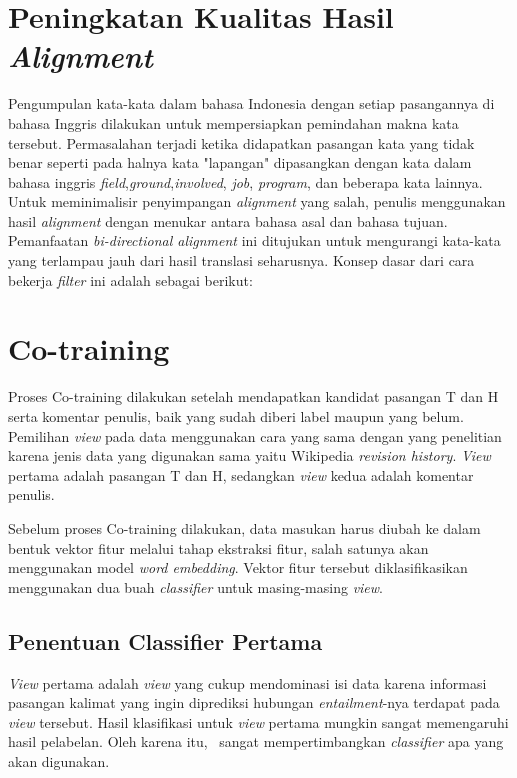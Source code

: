 \section{Peningkatan Kualitas Hasil \textit{Alignment}}
Pengumpulan kata-kata dalam bahasa Indonesia dengan setiap pasangannya di bahasa Inggris dilakukan untuk mempersiapkan pemindahan makna kata tersebut. Permasalahan terjadi ketika didapatkan pasangan kata yang tidak benar seperti pada halnya kata "lapangan" dipasangkan dengan kata dalam bahasa inggris \textit{field},\textit{ground},\textit{involved}, \textit{job}, \textit{program}, dan beberapa kata lainnya. Untuk meminimalisir penyimpangan \textit{alignment} yang salah, penulis menggunakan hasil \textit{alignment} dengan menukar antara bahasa asal dan bahasa tujuan. Pemanfaatan \textit{bi-directional alignment} ini ditujukan untuk mengurangi kata-kata yang terlampau jauh dari hasil translasi seharusnya. Konsep dasar dari cara bekerja \textit{filter} ini adalah sebagai berikut:

\section{Co-training} \label{sec:Co-training}
Proses Co-training dilakukan setelah mendapatkan kandidat pasangan T dan H serta komentar penulis, baik yang sudah diberi label maupun yang belum. Pemilihan \textit{view} pada data menggunakan cara yang sama dengan yang penelitian \cite{zanzottoRTEexpand} karena jenis data yang digunakan sama yaitu Wikipedia \textit{revision history}. \textit{View} pertama adalah pasangan T dan H, sedangkan \textit{view} kedua adalah komentar penulis.

Sebelum proses Co-training dilakukan, data masukan harus diubah ke dalam bentuk vektor fitur melalui tahap ekstraksi fitur, salah satunya akan menggunakan model \textit{word embedding}. Vektor fitur tersebut diklasifikasikan menggunakan dua buah \textit{classifier} untuk masing-masing \textit{view}. 

	\subsection{Penentuan Classifier Pertama}
	\textit{View} pertama adalah \textit{view} yang cukup mendominasi isi data karena informasi pasangan kalimat yang ingin diprediksi hubungan \textit{entailment}-nya terdapat pada \textit{view} tersebut. Hasil klasifikasi untuk \textit{view} pertama mungkin sangat memengaruhi hasil pelabelan. Oleh karena itu, \saya~sangat mempertimbangkan \textit{classifier} apa yang akan digunakan.
	
